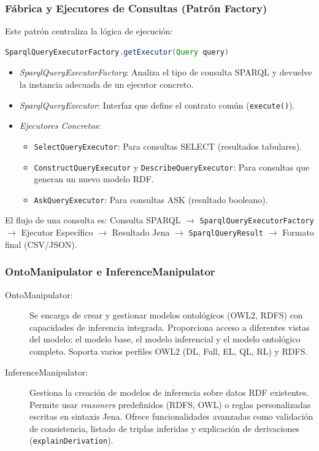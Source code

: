 \documentclass{article}
\begin{document}
\subsubsection{Fábrica y Ejecutores de Consultas (Patrón Factory)}
Este patrón centraliza la lógica de ejecución:
\begin{lstlisting}[language=Java, basicstyle=\small\ttfamily]
SparqlQueryExecutorFactory.getExecutor(Query query)
\end{lstlisting}
\begin{itemize}
    \item \textit{SparqlQueryExecutorFactory}: Analiza el tipo de consulta SPARQL y devuelve la instancia adecuada de un ejecutor concreto.
    \item \textit{SparqlQueryExecutor}: Interfaz que define el contrato común (\texttt{execute()}).
    \item \textit{Ejecutores Concretos}:
    \begin{itemize}
        \item \texttt{SelectQueryExecutor}: Para consultas SELECT (resultados tabulares).
        \item \texttt{ConstructQueryExecutor} y \texttt{DescribeQueryExecutor}: Para consultas que generan un nuevo modelo RDF.
        \item \texttt{AskQueryExecutor}: Para consultas ASK (resultado booleano).
    \end{itemize}
\end{itemize}
El flujo de una consulta es: Consulta SPARQL $\rightarrow$ \texttt{SparqlQueryExecutorFactory} $\rightarrow$ Ejecutor Específico $\rightarrow$ Resultado Jena $\rightarrow$ \texttt{SparqlQueryResult} $\rightarrow$ Formato final (CSV/JSON).

\subsubsection{OntoManipulator e InferenceManipulator}
\begin{description}
    \item[OntoManipulator:] Se encarga de crear y gestionar modelos ontológicos (OWL2, RDFS) con capacidades de inferencia integrada. Proporciona acceso a diferentes vistas del modelo: el modelo base, el modelo inferencial y el modelo ontológico completo. Soporta varios perfiles OWL2 (DL, Full, EL, QL, RL) y RDFS.
    \item[InferenceManipulator:] Gestiona la creación de modelos de inferencia sobre datos RDF existentes. Permite usar \textit{reasoners} predefinidos (RDFS, OWL) o reglas personalizadas escritas en sintaxis Jena. Ofrece funcionalidades avanzadas como validación de consistencia, listado de triplas inferidas y explicación de derivaciones (\texttt{explainDerivation}).
\end{description}
\end{document}
